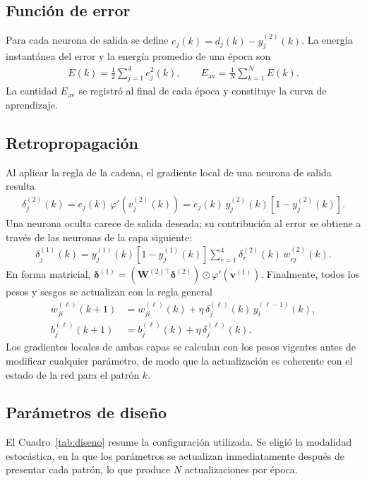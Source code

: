 \documentclass[conference]{IEEEtran}
\begin{document}
\subsection{Función de error}
Para cada neurona de salida se define $e_j(k)=d_j(k)-y_j^{(2)}(k)$. La
energía instantánea del error y la energía promedio de una época son
\begin{align}
    \label{eq:E}
    E(k)=\frac{1}{2}\sum_{j=1}^{4}e_j^2(k),\qquad
    E_{\text{av}}=\frac{1}{N}\sum_{k=1}^{N}E(k).
\end{align}
La cantidad $E_{\text{av}}$ se registró al final de cada época y constituye
la curva de aprendizaje.

\subsection{Retropropagación}
Al aplicar la regla de la cadena, el gradiente local de una neurona de
salida resulta
\begin{align}
    \label{eq:delta2}
    \delta_j^{(2)}(k)=e_j(k)\,\varphi'\!\left(v_j^{(2)}(k)\right)
    =e_j(k)\,y_j^{(2)}(k)\left[1-y_j^{(2)}(k)\right].
\end{align}
Una neurona oculta carece de salida deseada; su contribución al error se
obtiene a través de las neuronas de la capa siguiente:
\begin{align}
    \label{eq:delta1}
    \delta_j^{(1)}(k)=y_j^{(1)}(k)\left[1-y_j^{(1)}(k)\right]\sum_{r=1}^{4}\delta_r^{(2)}(k)\,w_{rj}^{(2)}(k).
\end{align}
En forma matricial,
$\boldsymbol{\delta}^{(1)}=\left(\mathbf{W}^{(2)\top}\boldsymbol{\delta}^{(2)}\right)\odot\varphi'\!\left(\mathbf{v}^{(1)}\right)$.
Finalmente, todos los pesos y sesgos se actualizan con la regla general
\begin{align}
    \label{eq:updW}
    w_{ji}^{(\ell)}(k+1)&=w_{ji}^{(\ell)}(k)+\eta\,\delta_j^{(\ell)}(k)\,y_i^{(\ell-1)}(k),\\
    \label{eq:updb}
    b_j^{(\ell)}(k+1)&=b_j^{(\ell)}(k)+\eta\,\delta_j^{(\ell)}(k).
\end{align}
Los gradientes locales de ambas capas se calculan con los pesos vigentes
antes de modificar cualquier parámetro, de modo que la actualización es
coherente con el estado de la red para el patrón $k$.

\subsection{Parámetros de diseño}
El Cuadro~\ref{tab:diseno} resume la configuración utilizada. Se eligió la
modalidad estocástica, en la que los parámetros se actualizan
inmediatamente después de presentar cada patrón, lo que produce $N$
actualizaciones por época.
\end{document}
